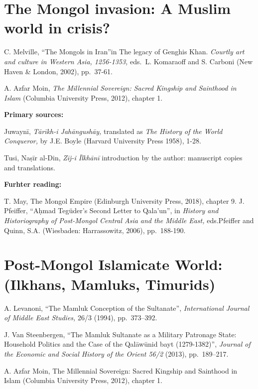 \documentclass[
]{book}
\begin{document}
\hypertarget{the-mongol-invasion-a-muslim-world-in-crisis}{%
\chapter{The Mongol invasion: A Muslim world in crisis?}\label{the-mongol-invasion-a-muslim-world-in-crisis}}

C. Melville, ``The Mongols in Iran''in The legacy of Genghis Khan. \emph{Courtly art and culture in Western Asia, 1256-1353,} eds.~L. Komaraoff and S. Carboni (New Haven \& London, 2002), pp.~37-61.

A. Azfar Moin, \emph{The Millennial Sovereign: Sacred Kingship and Sainthood in Islam} (Columbia University Press, 2012), chapter 1.

\textbf{Primary sources:}

Juwaynī, \emph{Tārīkh-i Jahāngushāy,} translated as \emph{The History of the World Conqueror,} by J.E. Boyle (Harvard University Press 1958), 1-28.

Tusi, Naṣīr al-Din, \emph{Zīj-i Īlkhānī} introduction by the author: manuscript copies and translations.

\textbf{Furhter reading:}

T. May, The Mongol Empire (Edinburgh University Press, 2018), chapter 9.
J. Pfeiffer, ``Aḥmad Tegüder's Second Letter to Qala'un'', in \emph{History and Historiography of Post-Mongol Central Asia and the Middle East,} eds.Pfeiffer and Quinn, S.A. (Wiesbaden: Harrassowitz, 2006), pp.~188-190.

\hypertarget{post-mongol-islamicate-world-ilkhans-mamluks-timurids}{%
\chapter{Post-Mongol Islamicate World: (Ilkhans, Mamluks, Timurids)}\label{post-mongol-islamicate-world-ilkhans-mamluks-timurids}}

A. Levanoni, ``The Mamluk Conception of the Sultanate'', \emph{International Journal of Middle East Studies,} 26/3 (1994), pp.~373--392.

J. Van Steenbergen, ``The Mamluk Sultanate as a Military Patronage State: Household Politics and the Case of the Qalāwūnid bayt (1279-1382)'', \emph{Journal of the Economic and Social History of the Orient 56/2} (2013), pp.~189--217.

A. Azfar Moin, The Millennial Sovereign: Sacred Kingship and Sainthood in Islam (Columbia University Press, 2012), chapter 1.
\end{document}
